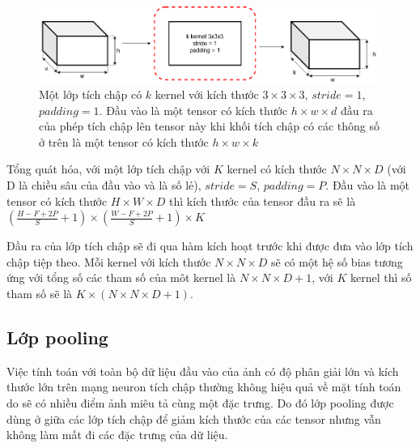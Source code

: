 \begin{figure}[ht!]
	\centerline{\includegraphics[scale=0.4]{images/convol_layer_in_out.png}}
  	\caption{Một lớp tích chập có $k$ kernel với kích thước $3 \times 3 \times 3$, $stride = 1$, $padding = 1$. Đầu vào là một tensor có kích thước $h \times w \times d$ đầu ra của phép tích chập lên tensor này khi khối tích chập có các thông số ở trên là một tensor có kích thước $h \times w \times k$}
  	\label{fig:convol_layer_in_out}
\end{figure}
Tổng quát hóa, với một lớp tích chập với $K$ kernel có kích thước $N \times N \times D$ (với D là chiều sâu của đầu vào và là số lẻ), $stride=S$, $padding=P$. Đầu vào là một tensor có kích thước $H \times W \times D$ thì kích thước của tensor đầu ra sẽ là
$\left( 
	\frac
		{{H-F+2P}}
		{S}
	+1
\right)
\times
\left( 
	\frac
		{{W-F+2P}}
		{S}
	+1
\right)
\times
K$

Đầu ra của lớp tích chập sẽ đi qua hàm kích hoạt trước khi được đưa vào lớp tích chập tiệp theo. Mỗi kernel với kích thước $N \times N \times D$ sẽ có một hệ số bias tương ứng với tổng số các tham số của môt kernel là $N \times N \times D+1$, với $K$ kernel thì số tham số sẽ là $K \times (N \times N \times D+1)$.
\subsection{Lớp pooling}
Việc tính toán với toàn bộ dữ liệu đầu vào của ảnh có độ phân giải lớn và kích thước lớn trên mạng neuron tích chập thường không hiệu quả về mặt tính toán do sẽ có nhiều điểm ảnh miêu tả cùng một đặc trưng. Do đó lớp pooling được dùng ở giữa các lớp tích chập để giảm kích thước của các tensor nhưng vẫn không làm mất đi các đặc trưng của dữ liệu.

